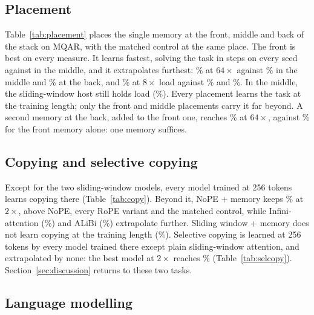 \documentclass[11pt]{article}
\begin{document}


\subsection{Placement}
\label{sec:placement}

Table~\ref{tab:placement} places the single memory at the front, middle and back of
the stack on MQAR, with the matched control at the same place. The front is best on
every measure. It learns fastest, solving the task in \frontSolveSteps{} steps on
every seed against \middleSolveSteps{} in the middle, and it extrapolates furthest:
\memMqarDistSixtyFour\% at $64\times$ against \placeMiddleDistSixtyFour\% in the middle
and \placeBackDistSixtyFour\% at the back, and \memMqarLoadEight\% at $8\times$ load
against \placeMiddleLoadEight\% and \placeBackLoadEight\%. In the middle, the
sliding-window host still holds load (\placeSwaMiddleLoadEight\%). Every placement
learns the task at the training length; only the front and middle placements carry
it far beyond. A second memory at the back, added to the front one, reaches
\xTwoDistSixtyFour\% at $64\times$, against \memMqarDistSixtyFour\% for the front memory
alone: one memory suffices.



\subsection{Copying and selective copying}
\label{sec:copy}

Except for the two sliding-window models, every model trained at 256 tokens learns
copying there (Table~\ref{tab:copy}). Beyond it, NoPE + memory keeps \memCopyDistTwo\%
at $2\times$, above NoPE, every RoPE variant and the matched control, while
Infini-attention (\infiniCopyDistTwo\%) and ALiBi (\alibiCopyDistTwo\%) extrapolate
further. Sliding window + memory does not learn copying at the training length
(\swaMemCopyVal\%). Selective copying is learned at 256 tokens by every model trained there
except plain sliding-window attention, and extrapolated by none: the best model at
$2\times$ reaches \bestSelDistTwo\% (Table~\ref{tab:selcopy}).
Section~\ref{sec:discussion} returns to these two tasks.

\subsection{Language modelling}
\label{sec:lm}
\end{document}
